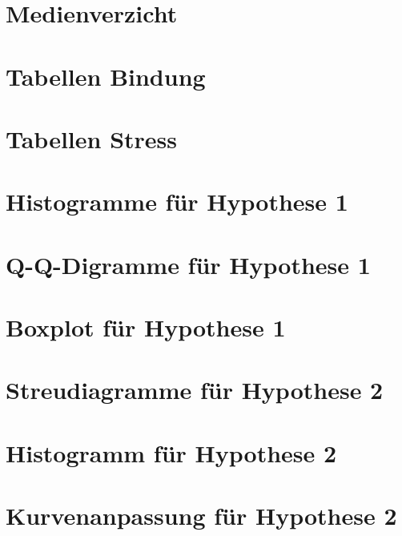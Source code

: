 \section{Medienverzicht}\label{app:Medienverzicht}

\newpage

\section{Tabellen Bindung}\label{app:TablesAas}

\newpage

\section{Tabellen Stress}\label{app:TablesPsq}

\newpage

\section{Histogramme für Hypothese 1}\label{app:Hypo1_Histogramme}

\newpage
\section{Q-Q-Digramme für Hypothese 1}\label{app:Hypo1_QQDiagramme}

\newpage
\section{Boxplot für Hypothese 1}\label{app:Hypo1_Boxplot}

\newpage
\section{Streudiagramme für Hypothese 2}\label{app:Hypo2_Streudiagramm}

\newpage
\section{Histogramm für Hypothese 2}\label{app:Hypo2_Histogramm}

\newpage
\section{Kurvenanpassung für Hypothese 2}\label{app:Hypo2_Kurvenanpassung}

\newpage
